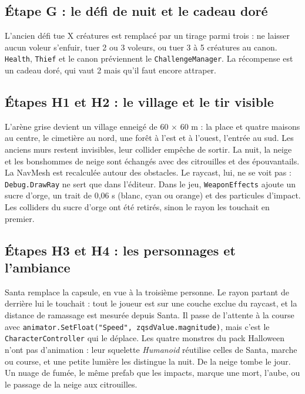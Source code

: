 \documentclass[11pt,a4paper]{article}
\begin{document}
\subsection{Étape G : le défi de nuit et le cadeau doré}
L'ancien défi \og tue X créatures \fg{} est remplacé par un tirage parmi trois : ne laisser aucun voleur s'enfuir, tuer 2 ou 3 voleurs, ou tuer 3 à 5 créatures au canon. \texttt{Health}, \texttt{Thief} et le canon préviennent le \texttt{ChallengeManager}. La récompense est un cadeau doré, qui vaut 2 mais qu'il faut encore attraper.

\subsection{Étapes H1 et H2 : le village et le tir visible}
L'arène grise devient un village enneigé de 60 $\times$ 60 m : la place et quatre maisons au centre, le cimetière au nord, une forêt à l'est et à l'ouest, l'entrée au sud. Les anciens murs restent invisibles, leur collider empêche de sortir. La nuit, la neige et les bonshommes de neige sont échangés avec des citrouilles et des épouvantails. La NavMesh est recalculée autour des obstacles. Le raycast, lui, ne se voit pas : \texttt{Debug.DrawRay} ne sert que dans l'éditeur. Dans le jeu, \texttt{WeaponEffects} ajoute un sucre d'orge, un trait de 0,06 s (blanc, cyan ou orange) et des particules d'impact. Les colliders du sucre d'orge ont été retirés, sinon le rayon les touchait en premier.

\subsection{Étapes H3 et H4 : les personnages et l'ambiance}
Santa remplace la capsule, en vue à la troisième personne. Le rayon partant de derrière lui le touchait : tout le joueur est sur une couche exclue du raycast, et la distance de ramassage est mesurée depuis Santa. Il passe de l'attente à la course avec \texttt{animator.SetFloat("Speed", zqsdValue.magnitude)}, mais c'est le \texttt{CharacterController} qui le déplace. Les quatre monstres du pack Halloween n'ont pas d'animation : leur squelette \emph{Humanoid} réutilise celles de Santa, marche ou course, et une petite lumière les distingue la nuit. De la neige tombe le jour. Un nuage de fumée, le même prefab que les impacts, marque une mort, l'aube, ou le passage de la neige aux citrouilles.
\end{document}

